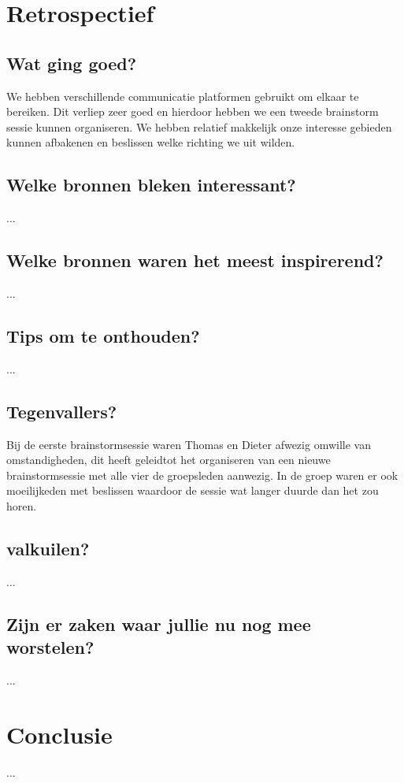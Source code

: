 \documentclass[fleqn,10pt]{voorstel}
\begin{document}
\section{Retrospectief}
\subsection{Wat ging goed?}
We hebben verschillende communicatie platformen gebruikt om elkaar te bereiken. Dit verliep zeer goed en hierdoor hebben we een tweede brainstorm sessie kunnen organiseren.
We hebben relatief makkelijk onze interesse gebieden kunnen afbakenen en beslissen welke richting we uit wilden.
\subsection{Welke bronnen bleken interessant?}
...
\subsection{Welke bronnen waren het meest inspirerend?}
...
\subsection{Tips om te onthouden?}
...
\subsection{Tegenvallers?}
Bij de eerste brainstormsessie waren Thomas en Dieter afwezig omwille van omstandigheden, dit heeft geleidtot het organiseren van een nieuwe brainstormsessie met alle vier de groepsleden aanwezig. In de groep waren er ook
moeilijkeden met beslissen waardoor de sessie wat langer duurde dan het zou horen.
\subsection{valkuilen?}
...
\subsection{Zijn er zaken waar jullie nu nog mee worstelen?}
...

\section{Conclusie}
...




\end{document}
